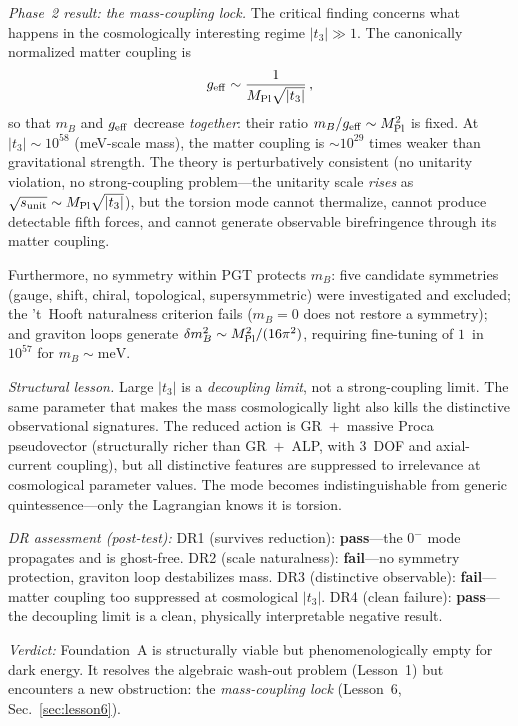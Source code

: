 \documentclass[aps,prd,twocolumn,superscriptaddress,showpacs,preprintnumbers,
  nofootinbib,longbibliography,floatfix]{revtex4-2}
\newcommand{\MPl}{M_{\rm Pl}}
\begin{document}
\textit{Phase~2 result: the mass-coupling lock.}
The critical finding concerns what happens in the cosmologically
interesting regime $|t_3| \gg 1$. The canonically normalized
matter coupling is
\begin{equation}\label{eq:geff}
  g_{\rm eff} \sim \frac{1}{\MPl\sqrt{|t_3|}}\,,
\end{equation}
so that $m_B$ and $g_{\rm eff}$ decrease \textit{together}: their ratio
$m_B/g_{\rm eff} \sim \MPl^2$ is fixed. At $|t_3|\sim 10^{58}$
(meV-scale mass), the matter coupling is $\sim\!10^{29}$ times weaker
than gravitational strength. The theory is perturbatively consistent (no
unitarity violation, no strong-coupling problem---the unitarity scale
\textit{rises} as $\sqrt{s_{\rm unit}}\sim \MPl\sqrt{|t_3|}$), but the
torsion mode cannot thermalize, cannot produce detectable fifth forces,
and cannot generate observable birefringence through its matter coupling.

Furthermore, no symmetry within PGT protects $m_B$: five candidate
symmetries (gauge, shift, chiral, topological, supersymmetric) were
investigated and excluded; the 't~Hooft naturalness criterion fails
($m_B = 0$ does not restore a symmetry); and graviton loops generate
$\delta m_B^2 \sim \MPl^2/(16\pi^2)$, requiring fine-tuning of
$1$~in~$10^{57}$ for $m_B \sim \text{meV}$.

\textit{Structural lesson.}
Large $|t_3|$ is a \textit{decoupling limit}, not a strong-coupling
limit. The same parameter that makes the mass cosmologically light also
kills the distinctive observational signatures. The reduced action is
GR~$+$~massive Proca pseudovector (structurally richer than GR~$+$~ALP,
with 3~DOF and axial-current coupling), but all distinctive features are
suppressed to irrelevance at cosmological parameter values. The mode
becomes indistinguishable from generic quintessence---only the Lagrangian
knows it is torsion.

\textit{DR assessment (post-test):}
DR1 (survives reduction): \textbf{pass}---the $0^-$ mode propagates and
is ghost-free.
DR2 (scale naturalness): \textbf{fail}---no symmetry protection, graviton
loop destabilizes mass.
DR3 (distinctive observable): \textbf{fail}---matter coupling too
suppressed at cosmological $|t_3|$.
DR4 (clean failure): \textbf{pass}---the decoupling limit is a clean,
physically interpretable negative result.

\textit{Verdict:} Foundation~A is structurally viable but
phenomenologically empty for dark energy. It resolves the algebraic
wash-out problem (Lesson~1) but encounters a new obstruction: the
\textit{mass-coupling lock} (Lesson~6, Sec.~\ref{sec:lesson6}).
\end{document}
